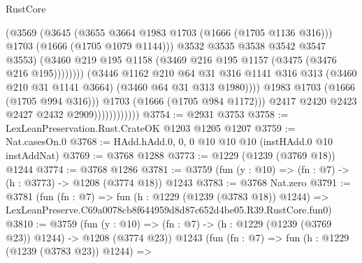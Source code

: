 \begin{lexlean}{RustCore}
\begin{coremodule}
                                            (@3569
                                              (@3645
                                                (@3655 @3664 @1983 @1703 (@1666 (@1705 @1136 @316)))
                                                @1703
                                                (@1666 (@1705 @1079 @1144)))
                                              @3532
                                              @3535
                                              @3538
                                              @3542
                                              @3547
                                              @3553)
                                            (@3460
                                              @219
                                              @195
                                              @1158
                                              (@3469 @216 @195 @1157 (@3475 (@3476 @216 @195))))))))
                                    (@3446
                                      @1162
                                      @210
                                      @64
                                      @31
                                      @316
                                      @1141
                                      @316
                                      @313
                                      (@3460 @210 @31 @1141 @3664)
                                      (@3460 @64 @31 @313 @1980))))
                                @1983
                                @1703
                                (@1666 (@1705 @994 @316)))
                              @1703
                              (@1666 (@1705 @984 @1172)))
                            @2417
                            @2420
                            @2423
                            @2427
                            @2432
                            @2909))))))))))))
@3754 := @2931 @3753
@3758 := LexLeanPreservation.Rust.CrateOK @1203 @1205 @1207
@3759 := Nat.casesOn.{0}
@3768 := HAdd.hAdd.{0, 0, 0} @10 @10 @10 (instHAdd.{0} @10 instAddNat)
@3769 := @3768 @1288
@3773 := @1229 (@1239 (@3769 @18)) @1244
@3774 := @3768 @1286
@3781 := @3759 (fun (y : @10) => (fn : @7) -> (h : @3773) -> @1208 (@3774 @18)) @1243
@3783 := @3768 Nat.zero
@3791 := @3781
    (fun (fn : @7) =>
    fun (h : @1229 (@1239 (@3783 @18)) @1244) =>
    LexLeanPreserve.C69a0078cb8f644959d8d87c652d4be05.R39.RustCore.fun0)
@3810 := @3759
    (fun (y : @10) => (fn : @7) -> (h : @1229 (@1239 (@3769 @23)) @1244) -> @1208 (@3774 @23))
    @1243
    (fun (fn : @7) =>
    fun (h : @1229 (@1239 (@3783 @23)) @1244) =>

\end{coremodule}
\end{lexlean}
